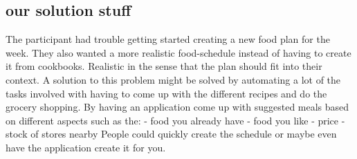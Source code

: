 \subsection{our solution stuff}
The participant had trouble getting started creating a new food plan for the week. They also wanted a more realistic food-schedule instead of having to create it from cookbooks. Realistic in the sense that the plan should fit into their context. A solution to this problem might be solved by automating a lot of the tasks involved with having to come up with the different recipes and do the grocery shopping.
By having an application come up with suggested meals based on different aspects such as the:
- food you already have
- food you like
- price
- stock of stores nearby
People could quickly create the schedule or maybe even have the application create it for you.
